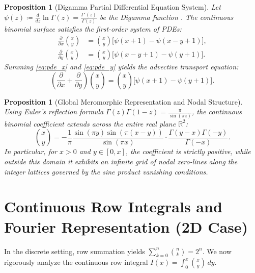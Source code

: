 \documentclass[11pt,a4paper]{article}
\theoremstyle{plain}
\newtheorem{proposition}[theorem]{Proposition}
\theoremstyle{definition}
\theoremstyle{remark}
\numberwithin{equation}{section}
\begin{document}
\begin{proposition}[Digamma Partial Differential Equation System]
Let $\psi(z) \coloneqq \frac{d}{dz}\ln \Gamma(z) = \frac{\Gamma'(z)}{\Gamma(z)}$ be the Digamma function \cite{olver1997}. The continuous binomial surface satisfies the first-order system of PDEs:
\begin{align}
\frac{\partial}{\partial x}\binom{x}{y} &= \binom{x}{y}\Big[\psi(x+1) - \psi(x-y+1)\Big], \label{eq:pde_x}\\
\frac{\partial}{\partial y}\binom{x}{y} &= \binom{x}{y}\Big[\psi(x-y+1) - \psi(y+1)\Big]. \label{eq:pde_y}
\end{align}
Summing \eqref{eq:pde_x} and \eqref{eq:pde_y} yields the advective transport equation:
\begin{equation}
\left(\frac{\partial}{\partial x} + \frac{\partial}{\partial y}\right)\binom{x}{y} = \binom{x}{y}\Big[\psi(x+1) - \psi(y+1)\Big].
\end{equation}
\end{proposition}

\begin{proposition}[Global Meromorphic Representation and Nodal Structure]
Using Euler's reflection formula $\Gamma(z)\Gamma(1-z) = \frac{\pi}{\sin(\pi z)}$, the continuous binomial coefficient extends across the entire real plane $\mathbb{R}^2$:
\begin{equation}
\binom{x}{y} = -\frac{1}{\pi}\frac{\sin(\pi y)\sin(\pi(x-y))}{\sin(\pi x)} \cdot \frac{\Gamma(y-x)\Gamma(-y)}{\Gamma(-x)}.
\end{equation}
In particular, for $x > 0$ and $y \in [0, x]$, the coefficient is strictly positive, while outside this domain it exhibits an infinite grid of nodal zero-lines along the integer lattices governed by the sine product vanishing conditions.
\end{proposition}

\section{Continuous Row Integrals and Fourier Representation (2D Case)}

In the discrete setting, row summation yields $\sum_{k=0}^n \binom{n}{k} = 2^n$. We now rigorously analyze the continuous row integral $I(x) = \int_0^x \binom{x}{y}\,dy$.
\end{document}

